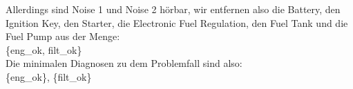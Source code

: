 \documentclass[ngerman]{fbi-aufgabenblatt}
\begin{document}
\begin{itemize}
Allerdings sind Noise 1 und Noise 2 hörbar, wir entfernen also die Battery, den Ignition Key, den Starter, die Electronic Fuel Regulation, den Fuel Tank und die Fuel Pump aus der Menge: \\
\{eng\_ok, filt\_ok\} \\

Die minimalen Diagnosen zu dem Problemfall sind also: \\
\{eng\_ok\}, \{filt\_ok\}

\end{itemize}
\end{document}
